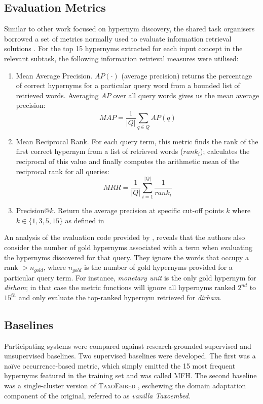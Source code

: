 \subsection{Evaluation Metrics}
Similar to other work \citep{espinosa2016supervised, ustalov2017negative} focused on hypernym discovery, the shared task organisers borrowed a set of metrics normally used to evaluate information retrieval solutions \citep{bian2008finding}.  For the top 15 hypernyms extracted for each input concept in the relevant subtask, the
following information retrieval measures were utilised:
\begin{enumerate}
    \item Mean Average Precision.  $AP(\cdot)$ (average precision) returns the percentage of correct hypernyms for a particular query word from a bounded list of retrieved words.  Averaging $AP$ over all query words gives us the mean average precision: 
    \[MAP = \frac{1}{\vert Q \vert} \sum_{q \in Q} AP(q)\]
    \item Mean Reciprocal Rank. For each query term, this metric finds the rank of the first correct hypernym from a list of retrieved words ($rank_i$); calculates the reciprocal of this value and finally computes the arithmetic mean of the reciprocal rank for all queries:
    \[MRR = \frac{1}{\vert Q \vert} \sum_{i=1}^{\vert Q \vert} \frac{1}{rank_i}\]
    \item Precision$@k$. Return the average precision at specific cut-off points $k$ where $k \in \{1, 3, 5, 15\}$ as defined in \citep{camacho2018semeval}
\end{enumerate}
An analysis of the evaluation code provided by \citeauthor{camacho2018semeval}, reveals that the authors also consider the number of gold hypernyms associated with a term when evaluating the hypernyms discovered for that query.  They ignore the words that occupy a rank $> n_{gold}$, where $n_{gold}$ is the number of gold hypernyms provided for a particular query term.  For instance, \textit{monetary unit} is the only gold hypernym for \textit{dirham}; in that case the metric functions will ignore all hypernyms ranked $2^{nd}$ to $15^{th}$ and only evaluate the top-ranked hypernym retrieved for \textit{dirham}.

\subsection{Baselines}
Participating systems were compared against research-grounded supervised and unsupervised baselines.  Two supervised baselines were developed.  The first was a na\"ive occurrence-based metric, which simply emitted the 15 most frequent hypernyms featured in the training set and was called \ac{MFH}.  The second baseline was a single-cluster version of \textsc{TaxoEmbed} \citep{espinosa2016supervised}, eschewing the domain adaptation component of the original, referred to as \textit{vanilla Taxoembed}.

